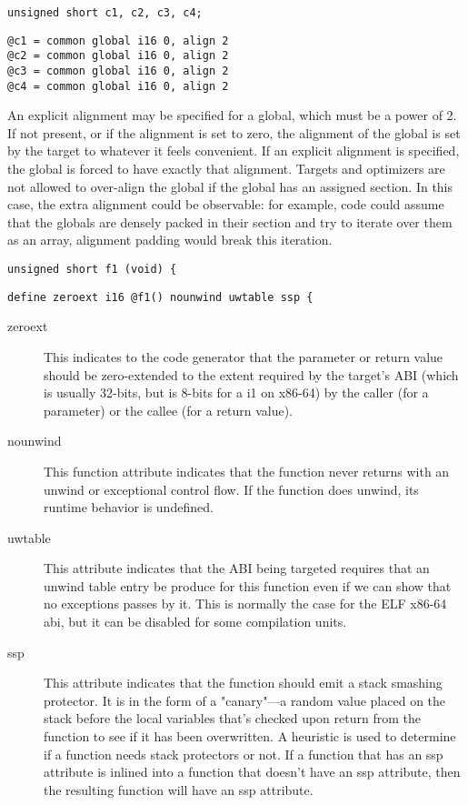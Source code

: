 \begin{lstlisting}
unsigned short c1, c2, c3, c4;
\end{lstlisting}

\begin{verbatim}
@c1 = common global i16 0, align 2
@c2 = common global i16 0, align 2
@c3 = common global i16 0, align 2
@c4 = common global i16 0, align 2
\end{verbatim}
An explicit alignment may be specified for a global, which must be a
power of 2. If not present, or if the alignment is set to zero, the
alignment of the global is set by the target to whatever it feels
convenient. If an explicit alignment is specified, the global is
forced to have exactly that alignment. Targets and optimizers are not
allowed to over-align the global if the global has an assigned
section. In this case, the extra alignment could be observable: for
example, code could assume that the globals are densely packed in
their section and try to iterate over them as an array, alignment
padding would break this iteration.

\begin{lstlisting}
unsigned short f1 (void) {
\end{lstlisting}

\begin{verbatim}
define zeroext i16 @f1() nounwind uwtable ssp {
\end{verbatim}
\begin{description}
\item[zeroext]
    This indicates to the code generator that the parameter or return value should be zero-extended to the extent required by the target's ABI (which is usually 32-bits, but is 8-bits for a i1 on x86-64) by the caller (for a parameter) or the callee (for a return value).
\item[nounwind]
    This function attribute indicates that the function never returns with an unwind or exceptional control flow. If the function does unwind, its runtime behavior is undefined.
\item[uwtable]
    This attribute indicates that the ABI being targeted requires that an unwind table entry be produce for this function even if we can show that no exceptions passes by it. This is normally the case for the ELF x86-64 abi, but it can be disabled for some compilation units.
\item[ssp]
    This attribute indicates that the function should emit a stack smashing protector. It is in the form of a "canary"---a random value placed on the stack before the local variables that's checked upon return from the function to see if it has been overwritten. A heuristic is used to determine if a function needs stack protectors or not.
    If a function that has an ssp attribute is inlined into a function that doesn't have an ssp attribute, then the resulting function will have an ssp attribute.
\end{description}

